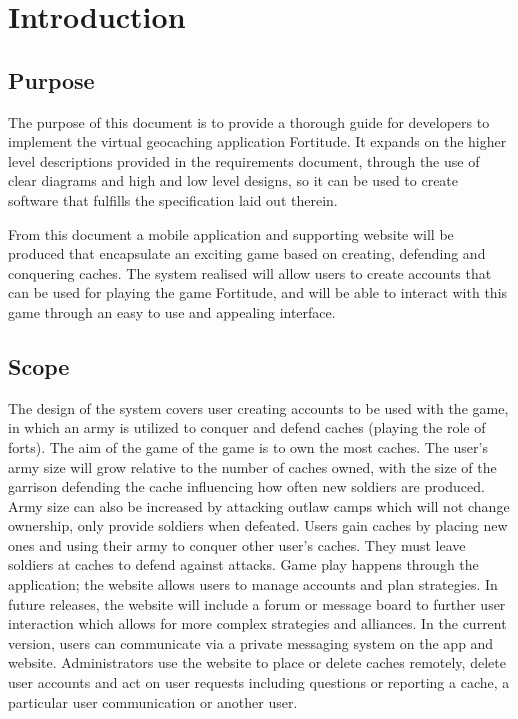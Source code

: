 \section{Introduction}

\subsection{Purpose}

The purpose of this document is to provide a thorough guide for developers to implement the virtual geocaching application Fortitude. It expands on the higher level descriptions provided in the requirements document, through the use of clear diagrams and high and low level designs, so it can be used to create software that fulfills the specification laid out therein. 

From this document a mobile application and supporting website will be produced that encapsulate an exciting game based on creating, defending and conquering caches. The system realised will allow users to create accounts that can be used for playing the game Fortitude, and will be able to interact with this game through an easy to use and appealing interface.

\subsection{Scope}

The design of the system covers user creating accounts to be used with the game, in which an army is utilized to conquer and defend caches (playing the role of forts). The aim of the game of the game is to own the most caches. The user’s army size will grow relative to the number of caches owned, with the size of the garrison defending the cache influencing how often new soldiers are produced. Army size can also be increased by attacking outlaw camps which will not change ownership, only provide soldiers when defeated. Users gain caches by placing new ones and using their army to conquer other user’s caches. They must leave soldiers at caches to defend against attacks. Game play happens through the application; the website allows users to manage accounts and plan strategies. In future releases, the website will include a forum or message board to further user interaction which allows for more complex strategies and alliances. In the current version, users can communicate via a private messaging system on the app and website. Administrators use the website to place or delete caches remotely, delete user accounts and act on user requests including questions or reporting a cache, a particular user communication or another user.

